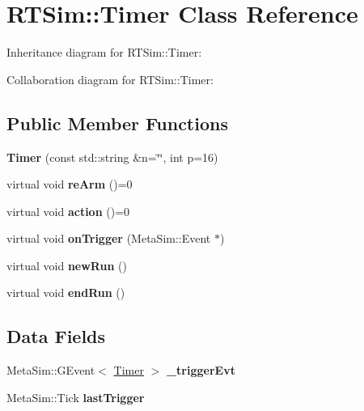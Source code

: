 \hypertarget{classRTSim_1_1Timer}{}\section{R\+T\+Sim\+:\+:Timer Class Reference}
\label{classRTSim_1_1Timer}


Inheritance diagram for R\+T\+Sim\+:\+:Timer\+:


Collaboration diagram for R\+T\+Sim\+:\+:Timer\+:
\subsection*{Public Member Functions}
\begin{DoxyCompactItemize}
\item 
{\bfseries Timer} (const std\+::string \&n=\char`\"{}\char`\"{}, int p=16)\hypertarget{classRTSim_1_1Timer_a25837fb022cde9327c053a115e35e8cd}{}\label{classRTSim_1_1Timer_a25837fb022cde9327c053a115e35e8cd}

\item 
virtual void {\bfseries re\+Arm} ()=0\hypertarget{classRTSim_1_1Timer_a6181323dfd57db009e765e6dd91239b6}{}\label{classRTSim_1_1Timer_a6181323dfd57db009e765e6dd91239b6}

\item 
virtual void {\bfseries action} ()=0\hypertarget{classRTSim_1_1Timer_a1d0c387157cf71ab38d076b7e0eba7ac}{}\label{classRTSim_1_1Timer_a1d0c387157cf71ab38d076b7e0eba7ac}

\item 
virtual void {\bfseries on\+Trigger} (Meta\+Sim\+::\+Event $\ast$)\hypertarget{classRTSim_1_1Timer_ac8935ddefce857c15de608a0832a382a}{}\label{classRTSim_1_1Timer_ac8935ddefce857c15de608a0832a382a}

\item 
virtual void {\bfseries new\+Run} ()\hypertarget{classRTSim_1_1Timer_a8ee0461d7bd769967c7ab58b5ed73128}{}\label{classRTSim_1_1Timer_a8ee0461d7bd769967c7ab58b5ed73128}

\item 
virtual void {\bfseries end\+Run} ()\hypertarget{classRTSim_1_1Timer_a24c062146d426284b9456f0d545f76c4}{}\label{classRTSim_1_1Timer_a24c062146d426284b9456f0d545f76c4}

\end{DoxyCompactItemize}
\subsection*{Data Fields}
\begin{DoxyCompactItemize}
\item 
Meta\+Sim\+::\+G\+Event$<$ \hyperlink{classRTSim_1_1Timer}{Timer} $>$ {\bfseries \+\_\+trigger\+Evt}\hypertarget{classRTSim_1_1Timer_ab911a60566380a4057740e23cfd5f7f2}{}\label{classRTSim_1_1Timer_ab911a60566380a4057740e23cfd5f7f2}

\item 
Meta\+Sim\+::\+Tick {\bfseries last\+Trigger}\hypertarget{classRTSim_1_1Timer_a09e8422fd144f9be0dbca4a09dc7dc0e}{}\label{classRTSim_1_1Timer_a09e8422fd144f9be0dbca4a09dc7dc0e}

\end{DoxyCompactItemize}



